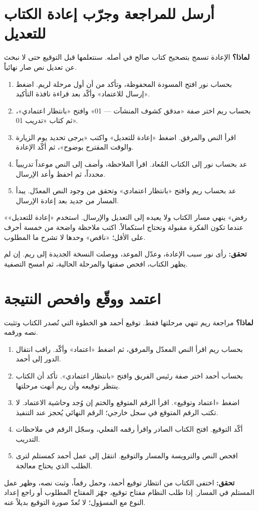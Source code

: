 \section{أرسل للمراجعة وجرّب إعادة الكتاب للتعديل}
\label{sec:return}
\textbf{لماذا؟} الإعادة تسمح بتصحيح كتاب صالح في أصله. سنتعلمها قبل التوقيع حتى لا نبحث عن تعديل نص صار نهائياً.
\begin{enumerate}
\item بحساب نور افتح المسودة المحفوظة، وتأكد من أن أول مرحلة لريم. اضغط «إرسال للاعتماد» وأكّد بعد قراءة نافذة التأكيد.
\item بحساب ريم اختر صفة «مدقق كشوف المنشآت — 01» وافتح «بانتظار اعتمادي»، ثم كتاب «تدريب 01».
\item اقرأ النص والمرفق. اضغط «إعادة للتعديل» واكتب «يرجى تحديد يوم الزيارة والوقت المقترح بوضوح»، ثم أكّد الإعادة.
\item عد بحساب نور إلى الكتاب المُعاد. اقرأ الملاحظة، وأضف إلى النص موعداً تدريبياً محدداً، ثم احفظ وأعد الإرسال.
\item عد بحساب ريم وافتح «بانتظار اعتمادي» وتحقق من وجود النص المعدّل. يبدأ المسار من جديد بعد إعادة الإرسال.
\end{enumerate}
\begin{rcnote}
«رفض» ينهي مسار الكتاب ولا يعيده إلى التعديل والإرسال. استخدم «إعادة للتعديل» عندما تكون الفكرة مقبولة وتحتاج استكمالاً. اكتب ملاحظة واضحة من خمسة أحرف على الأقل؛ «ناقص» وحدها لا تشرح ما المطلوب.
\end{rcnote}
\textbf{تحقق:} رأى نور سبب الإعادة، وعدّل الموعد، ووصلت النسخة الجديدة إلى ريم. إن لم يظهر الكتاب، افحص صفتها والمرحلة الحالية، ثم امسح التصفية.

\section{اعتمد ووقّع وافحص النتيجة}
\label{sec:sign}
\textbf{لماذا؟} مراجعة ريم تنهي مرحلتها فقط. توقيع أحمد هو الخطوة التي تُصدر الكتاب وتثبت نصه ورقمه.
\begin{enumerate}
\item بحساب ريم اقرأ النص المعدّل والمرفق، ثم اضغط «اعتماد» وأكّد. راقب انتقال الدور إلى أحمد.
\item بحساب أحمد اختر صفة رئيس الفريق وافتح «بانتظار اعتمادي». تأكد أن الكتاب ينتظر توقيعه وأن ريم أنهت مرحلتها.
\item اضغط «اعتماد وتوقيع». اقرأ الرقم المتوقع والختم إن وُجد وحاشية الاعتماد. لا تكتب الرقم المتوقع في سجل خارجي؛ الرقم النهائي يُحجز عند التنفيذ.
\item أكّد التوقيع. افتح الكتاب الصادر واقرأ رقمه الفعلي، وسجّل الرقم في ملاحظات التدريب.
\item افحص النص والترويسة والمسار والتوقيع. انتقل إلى عمل أحمد كمستلم لترى الطلب الذي يحتاج معالجة.
\end{enumerate}
\textbf{تحقق:} اختفى الكتاب من انتظار توقيع أحمد، وحمل رقماً، وثبت نصه، وظهر عمل المستلم في المسار. إذا طلب النظام مفتاح توقيع، جهّز المفتاح المطلوب أو راجع إعداد النوع مع المسؤول؛ لا تُعدّ صورة التوقيع بديلاً عنه.

